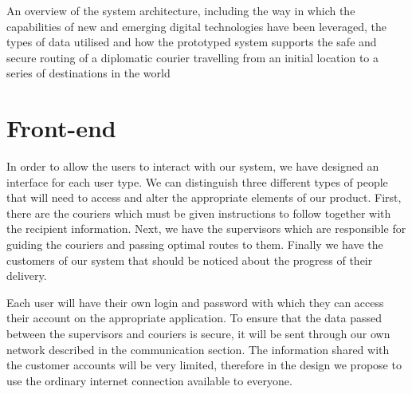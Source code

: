 An overview of the system architecture, including the way in which the capabilities of new and emerging digital technologies have been leveraged, the types of data utilised and how the prototyped system supports the safe and secure routing of a diplomatic courier travelling from an initial location to a series of destinations in the world 

\section{Front-end} \label{frontendarch}
In order to allow the users to interact with our system, we have designed an interface for each user type. We can distinguish three different types of people that will need to access and alter the appropriate elements of our product. First, there are the couriers which must be given instructions to follow together with the recipient information. Next, we have the supervisors which are responsible for guiding the couriers and passing optimal routes to them. Finally we have the customers of our system that should be noticed about the progress of their delivery.

Each user will have their own login and password with which they can access their account on the appropriate application. To ensure that the data passed between the supervisors and couriers is secure, it will be sent through our own network described in the communication section. The information shared with the customer accounts will be very limited, therefore in the design we propose to use the ordinary internet connection available to everyone.

